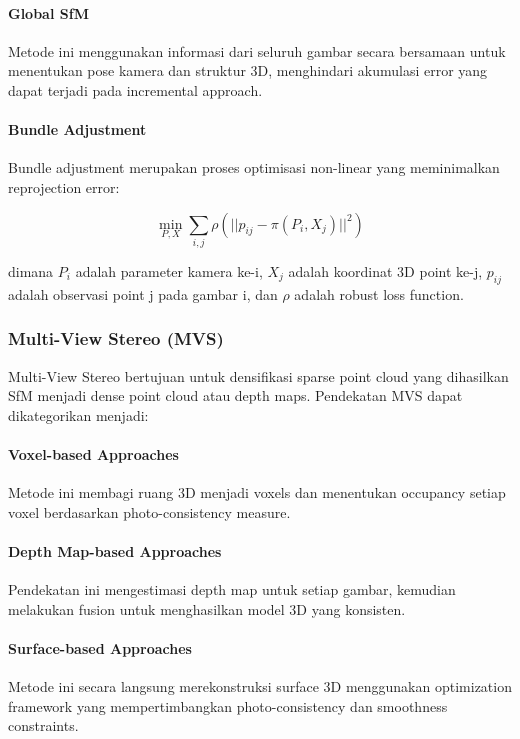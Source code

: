 \documentclass[12pt,a4paper]{article}
\begin{document}
\paragraph{Global SfM}
Metode ini menggunakan informasi dari seluruh gambar secara bersamaan untuk menentukan pose kamera dan struktur 3D, menghindari akumulasi error yang dapat terjadi pada incremental approach.

\paragraph{Bundle Adjustment}
Bundle adjustment merupakan proses optimisasi non-linear yang meminimalkan reprojection error:

\begin{equation}
\min_{P,X} \sum_{i,j} \rho(||p_{ij} - \pi(P_i, X_j)||^2)
\end{equation}

dimana $P_i$ adalah parameter kamera ke-i, $X_j$ adalah koordinat 3D point ke-j, $p_{ij}$ adalah observasi point j pada gambar i, dan $\rho$ adalah robust loss function.

\subsubsection{Multi-View Stereo (MVS)}

Multi-View Stereo bertujuan untuk densifikasi sparse point cloud yang dihasilkan SfM menjadi dense point cloud atau depth maps. Pendekatan MVS dapat dikategorikan menjadi:

\paragraph{Voxel-based Approaches}
Metode ini membagi ruang 3D menjadi voxels dan menentukan occupancy setiap voxel berdasarkan photo-consistency measure.

\paragraph{Depth Map-based Approaches}
Pendekatan ini mengestimasi depth map untuk setiap gambar, kemudian melakukan fusion untuk menghasilkan model 3D yang konsisten.

\paragraph{Surface-based Approaches}
Metode ini secara langsung merekonstruksi surface 3D menggunakan optimization framework yang mempertimbangkan photo-consistency dan smoothness constraints.
\end{document}
